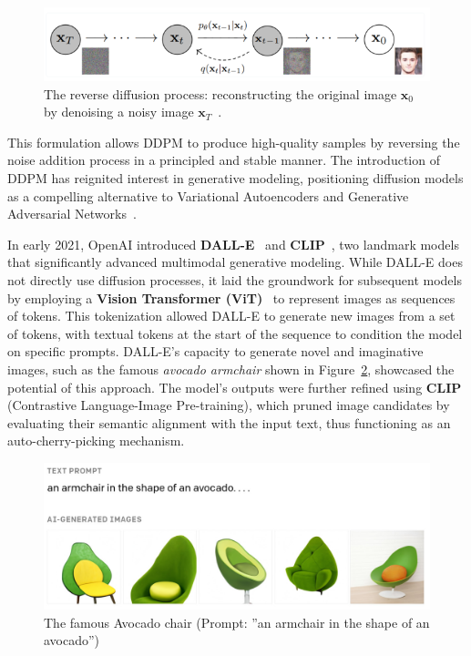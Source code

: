 \documentclass[12pt,DIV14,BCOR12mm,a4paper,footinclude=false,headinclude,parskip=half-,twoside,openright,cleardoublepage=empty,toc=index,bibliography=totoc,listof=totoc]{scrreprt}
\numberwithin{equation}{chapter}
\begin{document}
\begin{figure}
	\centering
	\includegraphics[scale=.9]{../media/diffusion_reverse_process.png}
	\caption{The reverse diffusion process: reconstructing the original image \(\mathbf{x}_0\) by denoising a noisy image \(\mathbf{x}_T\)~\cite{diffusion2}.}
	\label{reverse}
\end{figure}

This formulation allows DDPM to produce high-quality samples by reversing the noise addition process in a principled and stable manner. The introduction of DDPM has reignited interest in generative modeling, positioning diffusion models as a compelling alternative to Variational Autoencoders and Generative Adversarial Networks~\cite{nichol2021improved}.

In early 2021, OpenAI introduced \textbf{DALL-E}~\cite{DALL_E} and \textbf{CLIP}~\cite{CLIP}, two landmark models that significantly advanced multimodal generative modeling. While DALL-E does not directly use diffusion processes, it laid the groundwork for subsequent models by employing a \textbf{Vision Transformer (ViT)}~\cite{ViT} to represent images as sequences of tokens. This tokenization allowed DALL-E to generate new images from a set of tokens, with textual tokens at the start of the sequence to condition the model on specific prompts. DALL-E's capacity to generate novel and imaginative images, such as the famous \emph{avocado armchair} shown in Figure~\ref{AvacadoArmchair}, showcased the potential of this approach. The model's outputs were further refined using \textbf{CLIP} (Contrastive Language-Image Pre-training), which pruned image candidates by evaluating their semantic alignment with the input text, thus functioning as an auto-cherry-picking mechanism.
\begin{figure}
	\centering
	\includegraphics[scale=.3]{../media/DallE-AvacadoArmchair_1208x459.jpg}
	\caption{The famous Avocado chair (Prompt: ”an armchair in the shape of an avocado”)~\cite{openai2021}}
	\label{AvacadoArmchair}
\end{figure}
\end{document}
